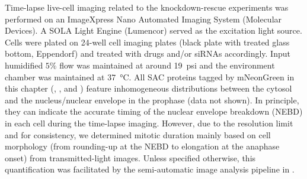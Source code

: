 Time-lapse live-cell imaging related to the knockdown-rescue experiments was performed on an ImageXpress Nano Automated Imaging System (Molecular Devices). A SOLA Light Engine (Lumencor) served as the excitation light source. Cells were plated on 24-well cell imaging plates (black plate with treated glass bottom, Eppendorf) and treated with drugs and/or siRNAs accordingly. Input humidified $5\%$  flow was maintained at around \SI{19}{psi} and the environment chamber was maintained at \SI{37}{\celsius}. All SAC proteins tagged by mNeonGreen in this chapter (, , and ) feature inhomogeneous distributions between the cytosol and the nucleus/nuclear envelope in the prophase (data not shown). In principle, they can indicate the accurate timing of the nuclear envelope breakdown (NEBD) in each cell during the time-lapse imaging. However, due to the resolution limit and for consistency, we determined mitotic duration mainly based on cell morphology (from rounding-up at the NEBD to elongation at the anaphase onset) from transmitted-light images. Unless specified otherwise, this quantification was facilitated by the semi-automatic image analysis pipeline in .

